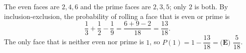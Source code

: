 The even faces are $2,4,6$ and the prime faces are $2,3,5$; only $2$ is both. By inclusion-exclusion, the probability of rolling a face that is even or prime is
\[\dfrac13+\dfrac12-\dfrac19=\dfrac{6+9-2}{18}=\dfrac{13}{18}.\]
The only face that is neither even nor prime is $1$, so $P(1)=1-\dfrac{13}{18}=\boxed{\textbf{(E) }\dfrac{5}{18}}$.
